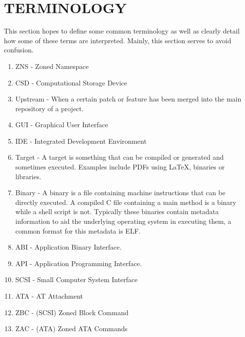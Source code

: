 \documentclass[conference]{IEEEtran}
\begin{document}
\section*{TERMINOLOGY} \label{term}

This section hopes to define some common terminology as well as clearly detail
how some of these terms are interpreted. Mainly, this section serves to avoid
confusion.

\begin{enumerate}
	\item ZNS      - Zoned Namespace
	\item CSD      - Computational Storage Device
	\item Upstream - When a certain patch or feature has been merged into the
					 main repository of a project.
	\item GUI      - Graphical User Interface
	\item IDE      - Integrated Development Environment
	\item Target   - A target is something that can be compiled or generated and
					 sometimes executed. Examples include PDFs using LaTeX,
					 binaries or libraries.
	\item Binary   - A binary is a file containing machine instructions that can
					 be directly executed. A compiled C file containing a main
					 method is a binary while a shell script is not. Typically
					 these binaries contain metadata information to aid the
					 underlying operating system in executing them, a common
					 format for this metadata is ELF.
	\item ABI      - Application Binary Interface.
	\item API      - Application Programming Interface.
	\item SCSI     - Small Computer System Interface
	\item ATA      - AT Attachment
	\item ZBC      - (SCSI) Zoned Block Command
	\item ZAC      - (ATA) Zoned ATA Commands
\end{enumerate}





\end{document}
